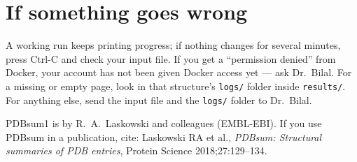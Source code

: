 \documentclass[11pt,a4paper]{article}
\newcommand{\file}[1]{\texttt{#1}}
\begin{document}
\section*{If something goes wrong}
A working run keeps printing progress; if nothing changes for several minutes, press Ctrl-C and check your input file. If you get a ``permission denied'' from Docker, your account has not been given Docker access yet --- ask Dr.~Bilal. For a missing or empty page, look in that structure's \file{logs/} folder inside \file{results/}. For anything else, send the input file and the \file{logs/} folder to Dr.~Bilal.

\vfill
{\small PDBsum1 is by R.~A.~Laskowski and colleagues (EMBL-EBI). If you use PDBsum in a publication, cite: Laskowski RA et al., \emph{PDBsum: Structural summaries of PDB entries}, Protein Science 2018;27:129--134.}
\end{document}
